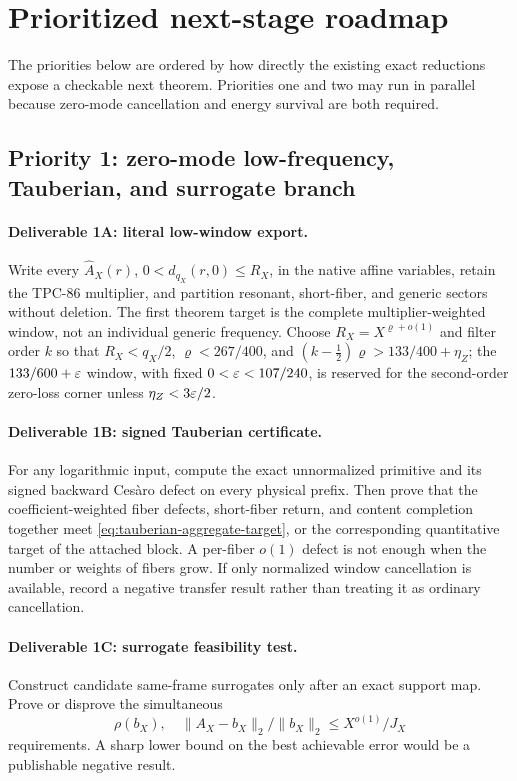 \section{Prioritized next-stage roadmap}
\label{sec:next-roadmap}

The priorities below are ordered by how directly the existing exact
reductions expose a checkable next theorem.  Priorities one and two
may run in parallel because zero-mode cancellation and energy survival
are both required.

\subsection{Priority 1: zero-mode low-frequency, Tauberian, and
surrogate branch}

\paragraph{Deliverable 1A: literal low-window export.}
Write every
\(\widehat A_X(r)\), \(0<d_{q_X}(r,0)\le R_X\), in the native affine
variables, retain the TPC-86 multiplier, and partition resonant,
short-fiber, and generic sectors without deletion.  The first theorem
target is the complete multiplier-weighted window, not an individual
generic frequency.  Choose \(R_X=X^{\varrho+o(1)}\) and filter order
\(k\) so that \(R_X<q_X/2\),
\(\varrho<267/400\), and
\((k-\tfrac12)\varrho>133/400+\eta_Z\); the
\(133/600+\varepsilon\) window, with fixed \(0<\varepsilon<107/240\), is
reserved for the second-order zero-loss corner unless
\(\eta_Z<3\varepsilon/2\).

\paragraph{Deliverable 1B: signed Tauberian certificate.}
For any logarithmic input, compute the exact unnormalized primitive
and its signed backward Ces\`aro defect on every physical prefix.
Then prove that the coefficient-weighted fiber defects, short-fiber
return, and content completion together meet
\eqref{eq:tauberian-aggregate-target}, or the corresponding
quantitative target of the attached block.  A per-fiber \(o(1)\)
defect is not enough when the number or weights of fibers grow.  If
only normalized window cancellation is available, record a negative
transfer result rather than treating it as ordinary cancellation.

\paragraph{Deliverable 1C: surrogate feasibility test.}
Construct candidate same-frame surrogates only after an exact support
map.  Prove or disprove the simultaneous
\[
 \rho(b_X),\quad
 \|A_X-b_X\|_2/\|b_X\|_2
 \le X^{o(1)}/J_X
\]
requirements.  A sharp lower bound on the best achievable error would
be a publishable negative result.

